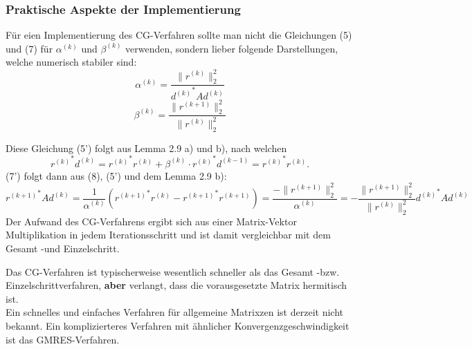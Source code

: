 \documentclass{article}
\begin{document}
    \subsubsection{Praktische Aspekte der Implementierung}
    \begin{rembox}
        Für eien Implementierung des CG-Verfahren sollte man nicht die Gleichungen (5) und (7) für $\alpha^{(k)}$ 
        und $\beta^{(k)}$ verwenden, sondern lieber folgende Darstellungen, welche numerisch stabiler sind:
        \[\alpha^{(k)} = \dfrac{\|r^{(k)}\|_2^2}{{d^{(k)}}^*Ad^{(k)}} \tag{5'}\]
        \[\beta^{(k)} = \dfrac{\|r^{(k+1)}\|_2^2}{\|r^{(k)}\|_2^2} \tag{7'}\]
    \end{rembox}
    Diese Gleichung (5') folgt aus Lemma 2.9 a) und b), nach welchen
    \[{r^{(k)}}^*d^{(k)} = {r^{(k)}}^*r^{(k)} + \beta^{(k)}\cdot {r^{(k)}}^*d^{(k-1)} = {r^{(k)}}^*r^{(k)}.\]
    (7') folgt dann aus (8), (5') und dem Lemma 2.9 b):
    \[{r^{(k+1)}}^*Ad^{(k)} = \dfrac{1}{\alpha^{(k)}}\left({r^{(k+1)}}^*r^{(k)} - {r^{(k+1)}}^*r^{(k+1)}\right) 
    =\dfrac{-\|r^{(k+1)}\|_2^2}{\alpha^{(k)}} = -\dfrac{\|r^{(k+1)}\|_2^2}{\|r^{(k)}\|_2^2}{d^{(k)}}^*Ad^{(k)}\] 
    Der Aufwand des CG-Verfahrens ergibt sich aus einer Matrix-Vektor Multiplikation in jedem Iterationsschritt 
    und ist damit vergleichbar mit dem Gesamt -und Einzelschritt.
    \begin{rembox}
        Das CG-Verfahren ist typischerweise wesentlich schneller als das Gesamt -bzw. Einzelschrittverfahren, 
        \textbf{aber} verlangt, dass die vorausgesetzte Matrix hermitisch ist. \\
        Ein schnelles und einfaches Verfahren für allgemeine Matrixzen ist derzeit nicht bekannt. Ein komplizierteres 
        Verfahren mit ähnlicher Konvergenzgeschwindigkeit ist das GMRES-Verfahren. 
    \end{rembox}
\end{document}
